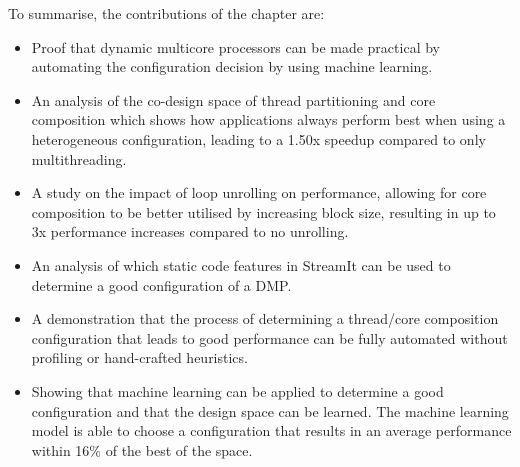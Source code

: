 To summarise, the contributions of the chapter are:
\begin{itemize}
\item Proof that dynamic multicore processors can be made practical by automating the configuration decision by using machine learning.
\vspace{-0.5em}
\item An analysis of the co-design space of thread partitioning and core composition which shows how applications always perform best when using a heterogeneous configuration, leading to a 1.50x speedup compared to only multithreading.
\vspace{-0.5em}
\item A study on the impact of loop unrolling on performance, allowing for core composition to be better utilised by increasing block size, resulting in up to 3x performance increases compared to no unrolling.
\vspace{-0.5em}
\item An analysis of which static code features in StreamIt can be used to determine a good configuration of a DMP.
\vspace{-0.5em}
\item A demonstration that the process of determining a thread/core composition configuration that leads to good performance can be fully automated without profiling or hand-crafted heuristics.
\vspace{-0.5em}
\item Showing that machine learning can be applied to determine a good configuration and that the design space can be learned. The machine learning model is able to choose a configuration that results in an average performance within 16\% of the best of the space.
\end{itemize}
